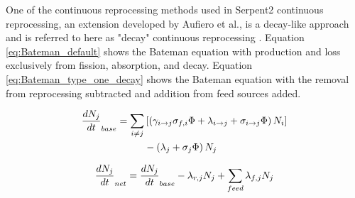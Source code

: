 One of the continuous reprocessing methods used in Serpent2 continuous reprocessing, an extension developed by Aufiero et al., is a decay-like approach and is referred to here as "decay" continuous reprocessing \cite{aufiero_extended_2013}. Equation \eqref{eq:Bateman_default} shows the Bateman equation with production and loss exclusively from fission, absorption, and decay.
Equation \eqref{eq:Bateman_type_one_decay} shows the Bateman equation with the removal from reprocessing subtracted and addition from feed sources added.

\begin{equation} \hfill
\begin{split}
\frac{dN_j}{dt}_{base} = \sum_{i \neq j}  & \left [ \left( \gamma_{i \rightarrow j} \sigma_{f, i} \Phi + \lambda _{i \rightarrow j} + \sigma_{i \rightarrow j} \Phi \right) N_i \right ]\\
 & - \left ( \lambda_j + \sigma_j \Phi \right ) N_j
\end{split}
\hfill\label{eq:Bateman_default} \end{equation}

\begin{equation} \hfill
\frac{dN_j}{dt}_{net} = \frac{dN_j}{dt}_{base} -  \lambda_{r, j} N_j + \sum_{feed} \lambda _{f, j} N_j
\hfill\label{eq:Bateman_type_one_decay} \end{equation}

